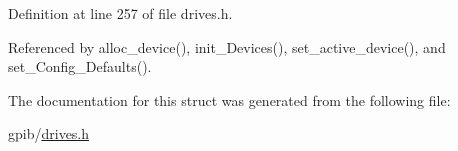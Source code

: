Definition at line 257 of file drives.\+h.



Referenced by alloc\+\_\+device(), init\+\_\+\+Devices(), set\+\_\+active\+\_\+device(), and set\+\_\+\+Config\+\_\+\+Defaults().



The documentation for this struct was generated from the following file\+:\begin{DoxyCompactItemize}
\item 
gpib/\hyperlink{drives_8h}{drives.\+h}\end{DoxyCompactItemize}
